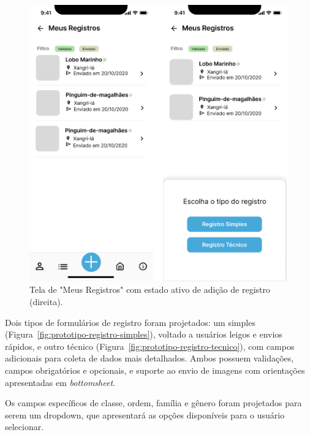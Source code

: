 \begin{figure}[H]
    \centering
    \includegraphics[height=0.6\textheight]{imagens/meus-registros-figma.png}
    \caption{Tela de "Meus Registros" com estado ativo de adição de registro (direita).}
    \label{fig:prototipo-meus-registros}
\end{figure}

Dois tipos de formulários de registro foram projetados: um simples
 (Figura~\ref{fig:prototipo-registro-simples}), voltado a usuários leigos e envios rápidos, e 
 outro técnico (Figura~\ref{fig:prototipo-registro-tecnico}), com campos adicionais 
 para coleta de dados mais detalhados. Ambos possuem validações, campos obrigatórios e 
 opcionais, e suporte ao envio de imagens com orientações apresentadas em \textit{bottomsheet}.

Os campos específicos de classe, ordem, família e gênero foram projetados para serem um dropdown,
que apresentará as opções disponíveis para o usuário selecionar.

